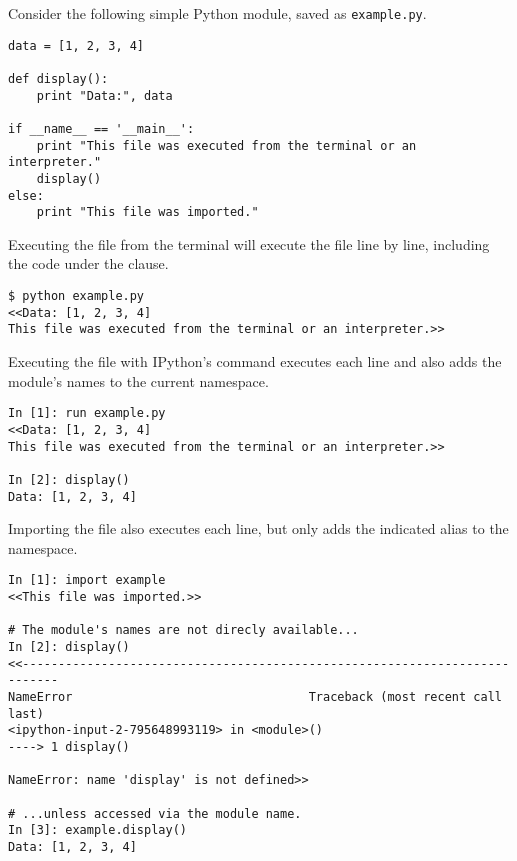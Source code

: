 Consider the following simple Python module, saved as \texttt{example.py}.
\begin{lstlisting}
data = [1, 2, 3, 4]

def display():
    print "Data:", data

if __name__ == '__main__':
    print "This file was executed from the terminal or an interpreter."
    display()
else:
    print "This file was imported."
\end{lstlisting}


Executing the file from the terminal will execute the file line by line, including the code under the  clause.

\begin{lstlisting}
$ python example.py
<<Data: [1, 2, 3, 4]
This file was executed from the terminal or an interpreter.>>
\end{lstlisting}

Executing the file with IPython's  command executes each line and also adds the module's names to the current namespace.

\begin{lstlisting}
In [1]: run example.py
<<Data: [1, 2, 3, 4]
This file was executed from the terminal or an interpreter.>>

In [2]: display()
Data: [1, 2, 3, 4]
\end{lstlisting}

Importing the file also executes each line, but only adds the indicated alias to the namespace.

\begin{lstlisting}
In [1]: import example
<<This file was imported.>>

# The module's names are not direcly available...
In [2]: display()
<<---------------------------------------------------------------------------
NameError                                 Traceback (most recent call last)
<ipython-input-2-795648993119> in <module>()
----> 1 display()

NameError: name 'display' is not defined>>

# ...unless accessed via the module name.
In [3]: example.display()
Data: [1, 2, 3, 4]
\end{lstlisting}

